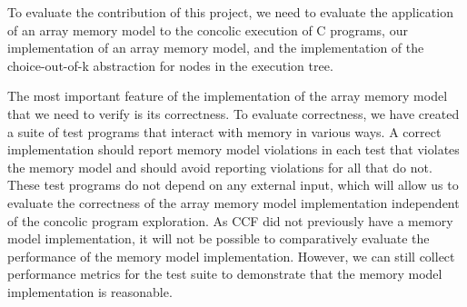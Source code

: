 \documentclass[12pt,twoside]{report}
\begin{document}

%

To evaluate the contribution of this project, we need to evaluate the application of an array memory model to the concolic execution of C programs, our implementation of an array memory model, and the implementation of the choice-out-of-k abstraction for nodes in the execution tree.

The most important feature of the implementation of the array memory model that we need to verify is its correctness. To evaluate correctness, we have created a suite of test programs that interact with memory in various ways. A correct implementation should report memory model violations in each test that violates the memory model and should avoid reporting violations for all that do not. These test programs do not depend on any external input, which will allow us to evaluate the correctness of the array memory model implementation independent of the concolic program exploration. As CCF did not previously have a memory model implementation, it will not be possible to comparatively evaluate the performance of the memory model implementation. However, we can still collect performance metrics for the test suite to demonstrate that the memory model implementation is reasonable.
\end{document}

